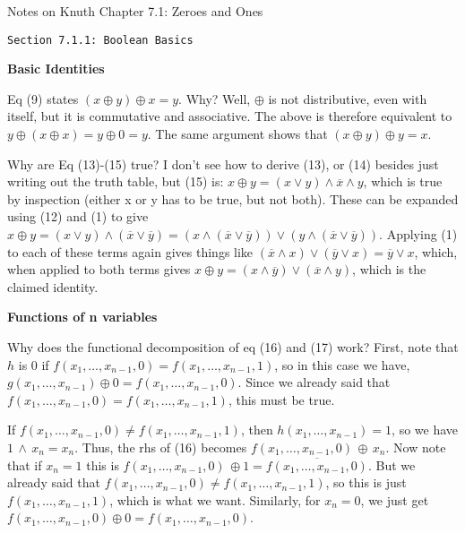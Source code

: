 \topglue 0.5in
\centerline{Notes on Knuth Chapter 7.1: Zeroes and Ones}
\vskip 0.3in
\centerline{\tt Section 7.1.1: Boolean Basics}
\vskip 0.2in

\noindent
{\bf Basic Identities}

\noindent [p 50] Eq (9) states $\left( x \oplus y \right)
\oplus x = y$.  Why?  \hfil\break
Well, $\oplus$ is not distributive, even with itself,
but it is commutative and associative. The above is therefore
equivalent to $y \oplus \left( x \oplus x \right) = y \oplus 0 = y$.
The same argument shows that $\left( x \oplus y \right) \oplus y = x$.

\vskip 0.05in
\noindent [p 51] Why are Eq (13)-(15) true? \hfil\break
I don't see how to derive (13), or (14) besides just writing out the truth table, but (15) is:
$x \oplus y = \left(x \vee y\right) \wedge \overline x \wedge y$, which
is true by inspection (either x or y has to be true, but not both).
These can be expanded using (12) and (1) to give
$x \oplus y = \left(x \vee y\right) \wedge \left(\overline{x} \vee \overline{y}
\right) = \left(x \wedge \left(\overline{x} \vee \overline{y}\right)\right)
\vee \left(y \wedge \left(\overline{x} \vee \overline{y}\right)\right)$.
Applying (1) to each of these terms again gives things like
$\left(\overline{x} \wedge x\right) \vee \left(\overline{y} \vee x\right) =
\overline{y} \vee x$, which, when applied to both terms gives
$x \oplus y = \left(x \wedge \overline{y}\right) \vee \left(\overline{x}
\wedge y\right)$, which is the claimed identity.

\vskip 0.1in
\noindent
{\bf Functions of n variables}

\noindent [p51] Why does the functional decomposition
of eq (16) and (17) work?\hfil\break
First, note that $h$ is 0 if
$f\left(x_1,\ldots,x_{n-1},0\right) = f\left( x_1,\ldots,x_{n-1},1\right)$, so
in this case we have,
 $g\left(x_1,\ldots,x_{n-1}\right) \oplus 0 = f\left(x_1,\ldots,x_{n-1},0\right)$.
 Since we already said that $f\left(x_1,\ldots,x_{n-1},0\right) = f\left( x_1,\ldots,x_{n-1},1\right)$, this must be true.  
 
If $f\left(x_1,\ldots,x_{n-1},0\right) \neq f\left( x_1,\ldots,x_{n-1},1\right)$,
then $h\left(x_1,\ldots,x_{n-1}\right)=1$, so we have $1\, \wedge\, x_n
= x_n$.  Thus, the rhs of (16) becomes $f\left(x_1,\ldots,x_{n-1},0\right) 
\, \oplus \, x_n$.  Now note that if $x_n = 1$ this is
$f\left(x_1,\ldots,x_{n-1},0\right) \, \oplus 1 = 
\overline{f\left(x_1,\ldots,x_{n-1},0\right)}$.  But we already said that
$f\left(x_1,\ldots,x_{n-1},0\right) \neq f\left( x_1,\ldots,x_{n-1},1\right)$,
so this is just $f\left(x_1,\ldots,x_{n-1},1\right)$, which is what we want.
Similarly, for $x_n = 0$, we just get
$f\left(x_1,\ldots,x_{n-1},0\right) \oplus 0 = f\left(x_1,\ldots,x_{n-1},0\right)$.

